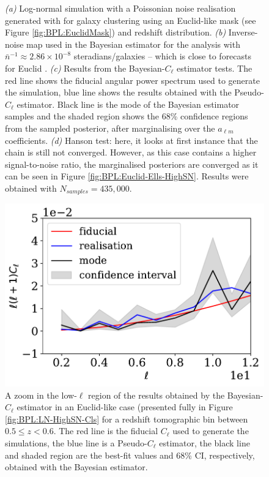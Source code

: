 \begin{figure}
\caption[Bayesian-$C_{\ell}$ estimator tested on a Euclid-like \flask log-normal simulation with signal-to-noise similar to Euclid's.]{\textit{(a)} Log-normal simulation with a Poissonian noise realisation generated with \flask for galaxy clustering using an Euclid-like mask (see Figure \ref{fig:BPL:EuclidMask}) and redshift distribution. \textit{(b)} Inverse-noise map used in the Bayesian estimator for the analysis with $\bar{n}^{-1}\approx 2.86\times 10^{-8}$ steradians/galaxies -- which is close to forecasts for Euclid \citep{2011EuclidRedPaper,2017EuclidLSST}. \textit{(c)} Results from the Bayesian-$C_{\ell}$ estimator tests. The red line shows the fiducial angular power spectrum used to generate the simulation, blue line shows the results obtained with the Pseudo-$C_{\ell}$ estimator. Black line is the mode of the Bayesian estimator samples and the shaded region shows the 68\% confidence regions from the sampled posterior, after marginalising over the $a_{\ell m}$ coefficients. \textit{(d)} Hanson test: here, it looks at first instance that the chain is still not converged. However, as this case contains a higher signal-to-noise ratio, the marginalised posteriors are converged as it can be seen in Figure \ref{fig:BPL:Euclid-Ells-HighSN}. Results were obtained with $N_{samples} = 435,000$.}
\label{fig:BPL:LogNormalFSAnalysisHighSN}
\end{figure}

\begin{figure}
\begin{center}
\includegraphics[scale=0.60]{BPL-FIGS/Euclid-LN-PNoi-N32-HDens_HPDCls-lowEll.pdf}
\caption[A zoom in the low-$\ell$ region of the results obtained by the Bayesian-$C_{\ell}$ estimator in an Euclid-like case for a redshift tomographic bin between $0.5 \leq z < 0.6$.]{A zoom in the low-$\ell$ region of the results obtained by the Bayesian-$C_{\ell}$ estimator in an Euclid-like case (presented fully in Figure \ref{fig:BPL:LN-HighSN-Cls} for a redshift tomographic bin between $0.5 \leq z < 0.6$. The red line is the fiducial $C_{\ell}$ used to generate the simulations, the blue line is a Pseudo-$C_{\ell}$ estimator, the black line and shaded region are the best-fit values and 68\% CI, respectively, obtained with the Bayesian estimator.}
\label{fig:BPL:LN-HighSN-LowEll}
\end{center}
\end{figure}

